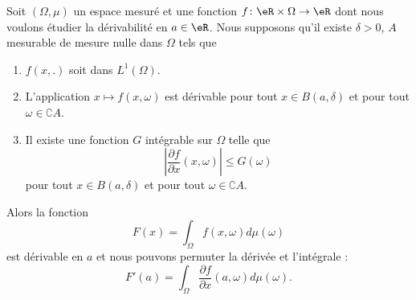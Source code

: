 \begin{theorem}    \label{ThoMWpRKYp}
    Soit \( (\Omega,\mu)\) un espace mesuré et une fonction \( f\colon \eR\times \Omega\to \eR\) dont nous voulons étudier la dérivabilité en \(a\in \eR\). Nous supposons qu'il existe \( \delta>0\), \( A\) mesurable de mesure nulle dans \( \Omega\) tels que
    \begin{enumerate}
        \item
            \( f(x,.)\) soit dans \( L^1(\Omega)\).
        \item
            L'application \( x\mapsto f(x,\omega)\) est dérivable pour tout \( x\in B(a,\delta)\) et pour tout \( \omega\in \complement A\).
        \item
            Il existe une fonction \( G\) intégrable sur \( \Omega\) telle que
            \begin{equation}
                \left| \frac{ \partial f }{ \partial x }(x,\omega) \right| \leq G(\omega)
            \end{equation}
            pour tout \( x\in B(a,\delta)\) et pour tout \( \omega\in\complement A\).
    \end{enumerate}
    Alors la fonction
    \begin{equation}
        F(x)=\int_{\Omega}f(x,\omega)d\mu(\omega)
    \end{equation}
    est dérivable en \( a\) et nous pouvons permuter la dérivée et l'intégrale :
    \begin{equation}
        F'(a)=\int_{\Omega}\frac{ \partial f }{ \partial x }(a,\omega)d\mu(\omega).
    \end{equation}
\end{theorem}

